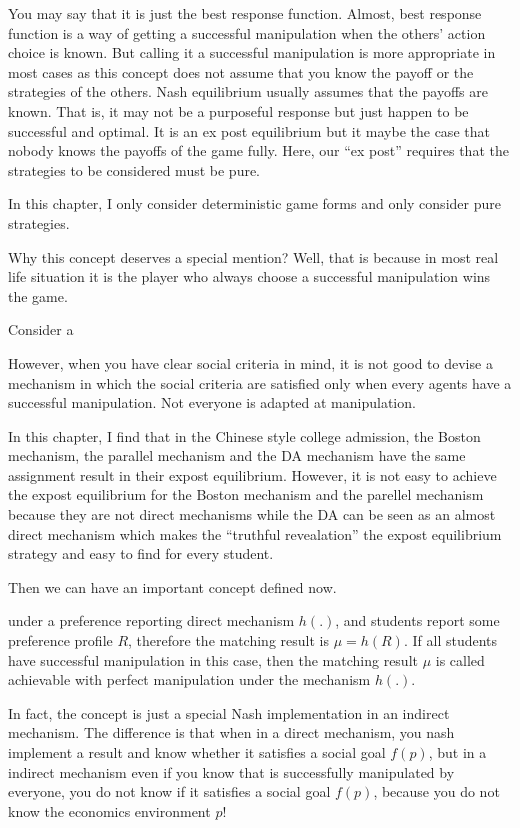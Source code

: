 You may say that it is just the best response function. Almost, best response function is a way of getting a successful manipulation when the others' action choice is known. But calling it a successful manipulation is more appropriate in most cases as this concept does not assume that you know the payoff or the strategies of the others. 
Nash equilibrium usually assumes that the payoffs are known. That is, it may not be a purposeful response but just happen to be successful and optimal. It is an ex post equilibrium but it maybe the case that 
nobody knows the payoffs of the game fully. Here, our ``ex post'' requires that the strategies to be considered must be pure.

In this chapter, I only consider deterministic game forms and only consider pure strategies. 

Why this concept deserves a special mention? Well, that is because in most real life situation it is the player who always choose a successful manipulation wins the game. 
\begin{example}
Consider a 
\end{example}

 
However, when you have clear social criteria in mind, it is not good to devise a mechanism in which the social criteria are satisfied only when every agents have a successful manipulation. Not everyone 
is adapted at manipulation.


In this chapter, I find that in the Chinese style college admission, the Boston mechanism, the parallel mechanism and the DA mechanism have the same assignment result in their expost equilibrium. However, it is not 
easy to achieve the expost equilibrium for the Boston mechanism and the parellel mechanism because they are not direct mechanisms while the DA can be seen as an almost direct mechanism which makes the ``truthful
revealation'' the expost equilibrium strategy and easy to find for every student.

Then we can have an important concept defined now.
\begin{definition}
under a preference reporting direct mechanism $h(.)$, and students report some preference profile $R$, therefore the matching result is $\mu=h(R)$.
If all students have successful manipulation in this case, then the matching result $\mu$ is called achievable with perfect manipulation under the mechanism $h(.)$.
\end{definition}

In fact, the concept is just a special Nash implementation in
an indirect mechanism. The difference is that when in a direct
mechanism, you nash implement a result and know whether it satisfies a
social goal $f(p)$, but in a indirect mechanism even if you know that
is successfully manipulated by everyone, you do not know if it
satisfies a social goal $f(p)$, because you do not know the economics
environment $p$!


